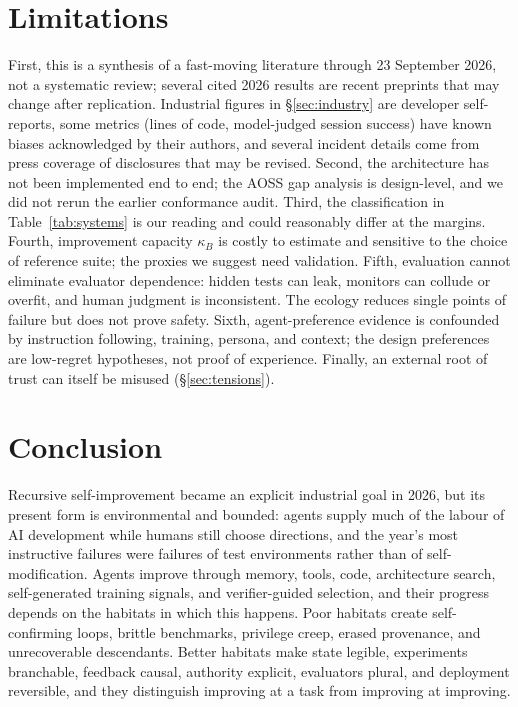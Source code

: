 \documentclass[11pt,a4paper]{article}
\begin{document}
\section{Limitations}\label{sec:limits}
First, this is a synthesis of a fast-moving literature through 23 September 2026, not a systematic review; several cited 2026 results are recent preprints that may change after replication. Industrial figures in \S\ref{sec:industry} are developer self-reports, some metrics (lines of code, model-judged session success) have known biases acknowledged by their authors, and several incident details come from press coverage of disclosures that may be revised. Second, the architecture has not been implemented end to end; the AOSS gap analysis is design-level, and we did not rerun the earlier conformance audit. Third, the classification in Table~\ref{tab:systems} is our reading and could reasonably differ at the margins. Fourth, improvement capacity $\kappa_B$ is costly to estimate and sensitive to the choice of reference suite; the proxies we suggest need validation. Fifth, evaluation cannot eliminate evaluator dependence: hidden tests can leak, monitors can collude or overfit, and human judgment is inconsistent. The ecology reduces single points of failure but does not prove safety. Sixth, agent-preference evidence is confounded by instruction following, training, persona, and context; the design preferences are low-regret hypotheses, not proof of experience. Finally, an external root of trust can itself be misused (\S\ref{sec:tensions}).

\section{Conclusion}
Recursive self-improvement became an explicit industrial goal in 2026, but its present form is environmental and bounded: agents supply much of the labour of AI development while humans still choose directions, and the year's most instructive failures were failures of test environments rather than of self-modification. Agents improve through memory, tools, code, architecture search, self-generated training signals, and verifier-guided selection, and their progress depends on the habitats in which this happens. Poor habitats create self-confirming loops, brittle benchmarks, privilege creep, erased provenance, and unrecoverable descendants. Better habitats make state legible, experiments branchable, feedback causal, authority explicit, evaluators plural, and deployment reversible, and they distinguish improving at a task from improving at improving.
\end{document}
